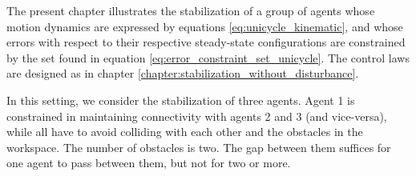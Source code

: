 The present chapter illustrates the stabilization of a group of agents whose
motion dynamics are expressed by equations \eqref{eq:unicycle_kinematic}, and
whose errors with respect to their respective steady-state configurations are
constrained by the set found in equation \eqref{eq:error_constraint_set_unicycle}.
The control laws are designed as in chapter
\ref{chapter:stabilization_without_disturbance}.

In this setting, we consider the stabilization of three agents. Agent 1
is constrained in maintaining connectivity with agents 2 and 3 (and vice-versa),
while all have to avoid colliding with each other and the obstacles in the
workspace. The number of obstacles is two. The gap between them suffices for
one agent to pass between them, but not for two or more.
